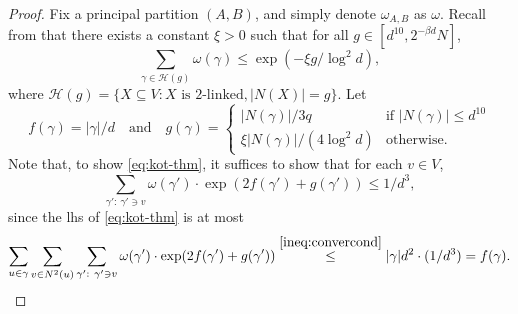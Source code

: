 \documentclass{amsart}
\theoremstyle{definition}
\newcommand{\we}{\omega}
\newcommand{\cH}{\mathcal{H} }
\newcommand{\sub}[0]{\subseteq}
\newcommand{\0}[0]{\emptyset}
\begin{document}
\begin{proof}
Fix a principal partition $(A, B)$, and simply denote $\we_{A, B}$ as $\we$. Recall from  that there exists a constant $\xi>0$ such that for all $g \in [d^{10}, 2^{-\beta d}N]$,
\begin{equation}\label{ineq:polyertotalweight}
\sum_{\gamma \in \cH(g)} \we(\gamma) \leq \exp(-\xi g/\log^2 d),
\end{equation}
where $\cH(g)=\{X \sub V: X \mbox{ is 2-linked}, |N(X)|=g\}$.
Let
\begin{equation}\label{def:fgfun}
f(\gamma)=|\gamma|/d \quad \text{and} \quad g(\gamma)=\begin{cases}
|N(\gamma)|/3q  & \text{if } |N(\gamma)|\leq d^{10} \\ 
\xi |N(\gamma)|/(4\log ^2d) & \text{otherwise}.
\end{cases}
\end{equation}
Note that, to show \eqref{eq:kot-thm}, it suffices to show that for each $v\in V$,
\begin{equation}\label{ineq:convercond}
\sum_{\gamma':\ \gamma'\ni v}\we(\gamma')\cdot \exp(2f(\gamma')+g(\gamma'))\leq 1/d^3, 
\end{equation}
since the lhs of \eqref{eq:kot-thm} is at most
\[
\sum_{u\in \gamma}\sum_{v\in N^2(u)}\sum_{\gamma':\ \gamma'\ni v}\we(\gamma')\cdot \exp(2f(\gamma')+g(\gamma'))\stackrel{\eqref{ineq:convercond}}{\le} |\gamma|d^2\cdot (1/d^3)=f(\gamma).
\]


\end{proof}
\end{document}
